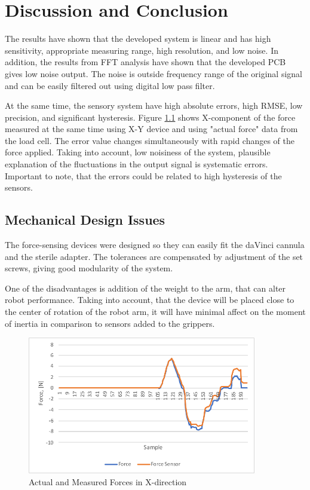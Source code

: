 \chapter{Discussion and Conclusion}
\label{discuss} %

The results have shown that the developed system is linear and has high sensitivity, appropriate measuring range, high resolution, and low noise. In addition, the results from FFT analysis have shown that the developed PCB gives low noise output. The noise is outside frequency range of the original signal and can be easily filtered out using digital low pass filter.

At the same time, the sensory system have high absolute errors, high RMSE, low precision, and significant hysteresis. Figure \ref{fig:Syst_err} shows X-component of the force measured at the same time using X-Y device and using "actual force" data from the load cell. The error value changes simultaneously with rapid changes of the force applied. Taking into account, low noisiness of the system, plausible explanation of the fluctuations in the output signal is systematic errors. Important to note, that the errors could be related to high hysteresis of the sensors.

\section{Mechanical Design Issues}

The force-sensing devices were designed so they can easily fit the daVinci cannula and the sterile adapter. The tolerances are compensated by adjustment of the set screws, giving good modularity of the system.

One of the disadvantages is addition of the weight to the arm, that can alter robot performance. Taking into account, that the device will be placed close to the center of rotation of the robot arm, it will have minimal affect on the moment of inertia in comparison to sensors added to the grippers.

\begin{figure}[h]
	\begin{center}
	\includegraphics[width=100mm]{fig/results/syst_error.pdf}
	\end{center}
	\vspace{-4mm}
	\caption[Actual and Measured Forces in X-direction]
	{Actual and Measured Forces in X-direction}
	\label{fig:Syst_err}
	\vspace{-2mm}
\end{figure}


